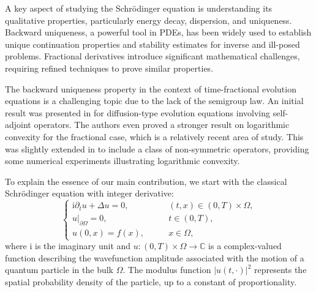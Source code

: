\documentclass[reqno]{amsart}
\numberwithin{equation}{section}
\begin{document}
A key aspect of studying the Schrödinger equation is understanding its qualitative properties, particularly energy decay, dispersion, and uniqueness. Backward uniqueness, a powerful tool in PDEs, has been widely used to establish unique continuation properties and stability estimates for inverse and ill-posed problems. Fractional derivatives introduce significant mathematical challenges, requiring refined techniques to prove similar properties.

The backward uniqueness property in the context of time-fractional evolution equations is a challenging topic due to the lack of the semigroup law. An initial result was presented in \cite{Ch24} for diffusion-type evolution equations involving self-adjoint operators. The authors even proved a stronger result on logarithmic convexity for the fractional case, which is a relatively recent area of study. This was slightly extended in \cite{Ch25} to include a class of non-symmetric operators, providing some numerical experiments illustrating logarithmic convexity.

To explain the essence of our main contribution, we start with the classical Schrödinger equation with integer derivative:
\begin{equation}\label{iseq}
\begin{cases}
\mathrm{i}\partial_t u +\Delta u =0, &\qquad (t, x) \in (0,T)\times \Omega,\\
u|_{\partial \Omega}=0, &\qquad t \in (0,T),\\
u(0,x)=f(x), &\qquad x\in \Omega,
\end{cases}
\end{equation}
where $\mathrm{i}$ is the imaginary unit and $u : (0,T)\times \Omega \rightarrow\mathbb{C}$ is a complex-valued function describing the wavefunction amplitude associated with the motion of a quantum particle in the bulk $\Omega$. The modulus function $|u(t,\cdot)|^2$ represents the spatial probability density of the particle, up to a constant of proportionality.
\end{document}
